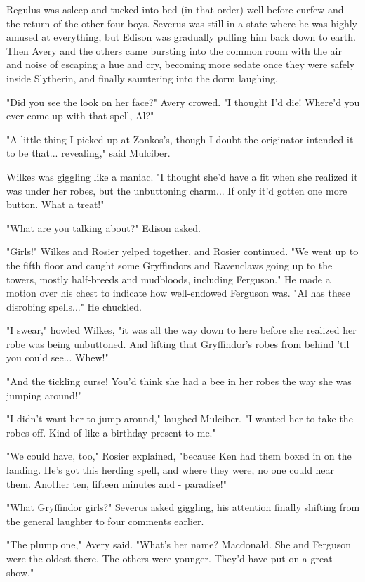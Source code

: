 Regulus was asleep and tucked into bed (in that order) well before curfew and the return of the other four boys. Severus was still in a state where he was highly amused at everything, but Edison was gradually pulling him back down to earth. Then Avery and the others came bursting into the common room with the air and noise of escaping a hue and cry, becoming more sedate once they were safely inside Slytherin, and finally sauntering into the dorm laughing.

"Did you see the look on her face?" Avery crowed. "I thought I'd die! Where'd you ever come up with that spell, Al?"

"A little thing I picked up at Zonkos's, though I doubt the originator intended it to be that... revealing," said Mulciber.

Wilkes was giggling like a maniac. "I thought she'd have a fit when she realized it was under her robes, but the unbuttoning charm... If only it'd gotten one more button. What a treat!"

"What are you talking about?" Edison asked.

"Girls!" Wilkes and Rosier yelped together, and Rosier continued. "We went up to the fifth floor and caught some Gryffindors and Ravenclaws going up to the towers, mostly half-breeds and mudbloods, including Ferguson." He made a motion over his chest to indicate how well-endowed Ferguson was. "Al has these disrobing spells..." He chuckled.

"I swear," howled Wilkes, "it was all the way down to here before she realized her robe was being unbuttoned. And lifting that Gryffindor's robes from behind 'til you could see... Whew!"

"And the tickling curse! You'd think she had a bee in her robes the way she was jumping around!"

"I didn't want her to jump around," laughed Mulciber. "I wanted her to take the robes off. Kind of like a birthday present to me."

"We could have, too," Rosier explained, "because Ken had them boxed in on the landing. He's got this herding spell, and where they were, no one could hear them. Another ten, fifteen minutes and - paradise!"

"What Gryffindor girls?" Severus asked giggling, his attention finally shifting from the general laughter to four comments earlier.

"The plump one," Avery said. "What's her name? Macdonald. She and Ferguson were the oldest there. The others were younger. They'd have put on a great show."

